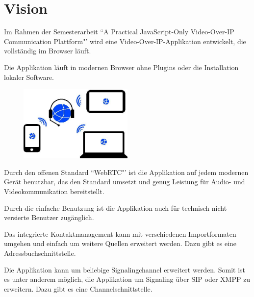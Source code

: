 \chapter{Vision}
	Im Rahmen der Semesterarbeit ``A Practical JavaScript-Only Video-Over-IP Communication Plattform"' wird eine
	Video-Over-IP-Applikation entwickelt, die vollständig im Browser läuft.
	
	Die Applikation läuft in modernen Browser ohne Plugins oder die Installation lokaler Software.
			
	\begin{figure}[H]
		\centering
		\includegraphics[width=0.5\textwidth]{img/plattformUnabhaengigkeit.jpg}
		\label{plattformUnabhaengigkeit}
	\end{figure}
	
	Durch den offenen Standard ``WebRTC"' ist die Applikation auf jedem modernen Gerät benutzbar, das den Standard umsetzt und genug Leistung für Audio- und Videokommunikation bereitstellt.
	
	Durch die einfache Benutzung ist die Applikation auch für technisch nicht
	versierte Benutzer zugänglich.
	
	Das integrierte Kontaktmanagement kann mit verschiedenen Importformaten umgehen und einfach um weitere Quellen erweitert werden. Dazu gibt es eine Adressbuchschnittstelle.
	
	Die Applikation kann um beliebige Signalingchannel erweitert werden. Somit ist
	es unter anderem möglich, die Applikation um Signaling über SIP oder XMPP zu
	erweitern. Dazu gibt es eine Channelschnittstelle.
	
	
